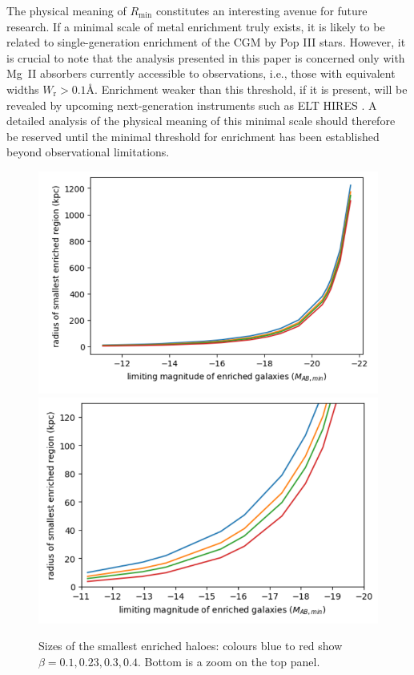 \documentclass[useAMS,usenatbib]{mn2e}
\newcommand{\magtwo}{Mg~{\small II} }
\begin{document}
The physical meaning of $R_\text{min}$ constitutes an interesting avenue for future research. If a minimal scale of metal enrichment truly exists, it is likely to be related to single-generation enrichment of the CGM by Pop III stars. However, it is crucial to note that the analysis presented in this paper is concerned only with \magtwo absorbers currently accessible to observations, i.e., those with equivalent widths $W_\text{r} > 0.1$\AA. Enrichment weaker than this threshold, if it is present, will be revealed by upcoming next-generation instruments such as ELT HIRES \citep{ELT-HIRES}. %
A detailed analysis of the physical meaning of this minimal scale should therefore be reserved until the minimal threshold for enrichment has been established beyond observational limitations.

\begin{figure}
\includegraphics[width=\columnwidth]{plots/smallest1.png}
\includegraphics[width=\columnwidth]{plots/smallest2.png}
\caption{Sizes of the smallest enriched haloes: colours blue to red show $\beta=0.1, 0.23, 0.3, 0.4$. Bottom is a zoom on the top panel.}
\end{figure}
\end{document}

